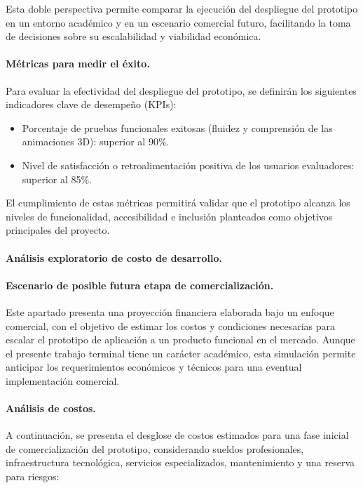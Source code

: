 \vspace{1em}
Esta doble perspectiva permite comparar la ejecución del despliegue del prototipo en un entorno académico y en un escenario comercial futuro, facilitando la toma de decisiones sobre su escalabilidad y viabilidad económica.

\paragraph{\textbf{Métricas para medir el éxito.}}
Para evaluar la efectividad del despliegue del prototipo, se definirán los siguientes indicadores clave de desempeño (KPIs):

\begin{itemize}
	\item Porcentaje de pruebas funcionales exitosas (fluidez y comprensión de las animaciones 3D): superior al 90\%.
	\item Nivel de satisfacción o retroalimentación positiva de los usuarios evaluadores: superior al 85\%.
\end{itemize}

El cumplimiento de estas métricas permitirá validar que el prototipo alcanza los niveles de funcionalidad, accesibilidad e inclusión planteados como objetivos principales del proyecto.

\paragraph{\textbf{Análisis exploratorio de costo de desarrollo.}}
\paragraph{\textbf{Escenario de posible futura etapa de comercialización.}}
Este apartado presenta una proyección financiera elaborada bajo un enfoque comercial, con el objetivo de estimar los costos y condiciones necesarias para escalar el prototipo de aplicación a un producto funcional en el mercado. Aunque el presente trabajo terminal tiene un carácter académico, esta simulación permite anticipar los requerimientos económicos y técnicos para una eventual implementación comercial.

\paragraph{\textbf{Análisis de costos.}}
A continuación, se presenta el desglose de costos estimados para una fase inicial de comercialización del prototipo, considerando sueldos profesionales, infraestructura tecnológica, servicios especializados, mantenimiento y una reserva para riesgos:


